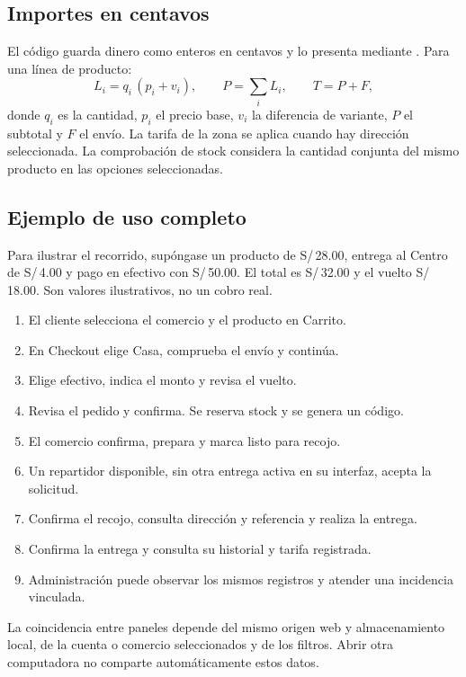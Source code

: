 \documentclass[12pt,letterpaper]{article}
\newcommand{\codigo}[1]{\texttt{\detokenize{#1}}}
\newcommand{\soles}[1]{S/\,#1}
\begin{document}
\subsection{Importes en centavos}

El código guarda dinero como enteros en centavos y lo presenta mediante \codigo{formatCents}. Para una línea de producto:
\[
  L_i = q_i\,(p_i + v_i), \qquad
  P = \sum_i L_i, \qquad T = P + F,
\]
donde $q_i$ es la cantidad, $p_i$ el precio base, $v_i$ la diferencia de variante, $P$ el subtotal y $F$ el envío. La tarifa de la zona se aplica cuando hay dirección seleccionada. La comprobación de stock considera la cantidad conjunta del mismo producto en las opciones seleccionadas.

\subsection{Ejemplo de uso completo}

Para ilustrar el recorrido, supóngase un producto de \soles{28.00}, entrega al Centro de \soles{4.00} y pago en efectivo con \soles{50.00}. El total es \soles{32.00} y el vuelto \soles{18.00}. Son valores ilustrativos, no un cobro real.

\begin{enumerate}
  \item El cliente selecciona el comercio y el producto en Carrito.
  \item En Checkout elige Casa, comprueba el envío y continúa.
  \item Elige efectivo, indica el monto y revisa el vuelto.
  \item Revisa el pedido y confirma. Se reserva stock y se genera un código.
  \item El comercio confirma, prepara y marca listo para recojo.
  \item Un repartidor disponible, sin otra entrega activa en su interfaz, acepta la solicitud.
  \item Confirma el recojo, consulta dirección y referencia y realiza la entrega.
  \item Confirma la entrega y consulta su historial y tarifa registrada.
  \item Administración puede observar los mismos registros y atender una incidencia vinculada.
\end{enumerate}

La coincidencia entre paneles depende del mismo origen web y almacenamiento local, de la cuenta o comercio seleccionados y de los filtros. Abrir otra computadora no comparte automáticamente estos datos.
\end{document}
